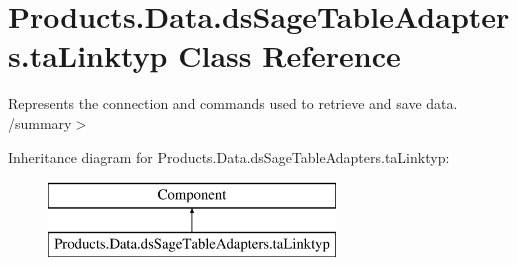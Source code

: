 \hypertarget{class_products_1_1_data_1_1ds_sage_table_adapters_1_1ta_linktyp}{}\section{Products.\+Data.\+ds\+Sage\+Table\+Adapters.\+ta\+Linktyp Class Reference}
\label{class_products_1_1_data_1_1ds_sage_table_adapters_1_1ta_linktyp}


Represents the connection and commands used to retrieve and save data. /summary$>$  


Inheritance diagram for Products.\+Data.\+ds\+Sage\+Table\+Adapters.\+ta\+Linktyp\+:\begin{figure}[H]
\begin{center}
\leavevmode
\includegraphics[height=2.000000cm]{class_products_1_1_data_1_1ds_sage_table_adapters_1_1ta_linktyp}
\end{center}
\end{figure}
